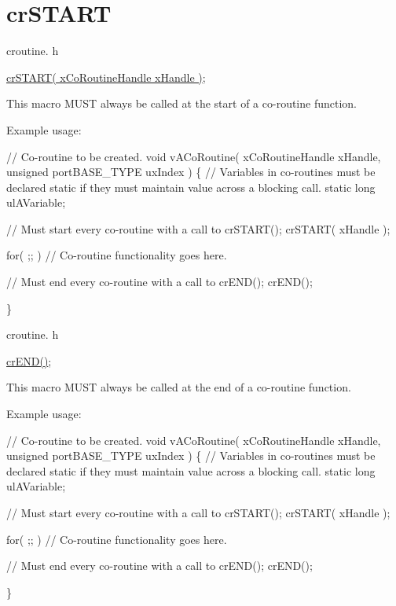 \hypertarget{group__crSTART}{}\section{cr\+S\+T\+A\+RT}
\label{group__crSTART}
croutine. h 
\begin{DoxyPre}
\hyperlink{croutine_8h_a19a57a201a325e8af1207ed68c4aedde}{crSTART( xCoRoutineHandle xHandle )};\end{DoxyPre}


This macro M\+U\+ST always be called at the start of a co-\/routine function.

Example usage\+: 
\begin{DoxyPre}
// Co-routine to be created.
void vACoRoutine( xCoRoutineHandle xHandle, unsigned portBASE\_TYPE uxIndex )
\{
// Variables in co-routines must be declared static if they must maintain value across a blocking call.
static long ulAVariable;
\begin{DoxyVerb}// Must start every co-routine with a call to crSTART();
crSTART( xHandle );

for( ;; )
{
     // Co-routine functionality goes here.
}

// Must end every co-routine with a call to crEND();
crEND();
\end{DoxyVerb}

\}\end{DoxyPre}


croutine. h 
\begin{DoxyPre}
\hyperlink{croutine_8h_ae6038cc976689b50000475ebfc4e2f23}{crEND()};\end{DoxyPre}


This macro M\+U\+ST always be called at the end of a co-\/routine function.

Example usage\+: 
\begin{DoxyPre}
// Co-routine to be created.
void vACoRoutine( xCoRoutineHandle xHandle, unsigned portBASE\_TYPE uxIndex )
\{
// Variables in co-routines must be declared static if they must maintain value across a blocking call.
static long ulAVariable;
\begin{DoxyVerb}// Must start every co-routine with a call to crSTART();
crSTART( xHandle );

for( ;; )
{
     // Co-routine functionality goes here.
}

// Must end every co-routine with a call to crEND();
crEND();
\end{DoxyVerb}

\}\end{DoxyPre}
 
